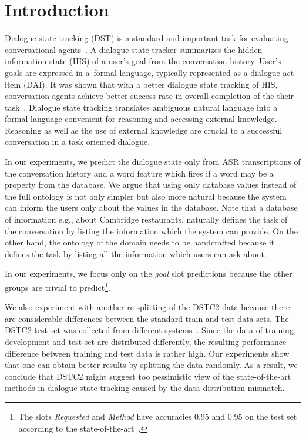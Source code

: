 \documentclass{itatnew}
\def\OD#1{{\color{darkgreen}OD: \it #1}}
\begin{document}
\section{Introduction}
%
Dialogue state tracking (DST) is a standard and important task for evaluating conversational agents~\cite{williams2013dialog, henderson2014second, henderson2014third}.
A dialogue state tracker summarizes the hidden information state (HIS)\cite{young2010hidden} of a user's goal from the conversation history.
User's goals are expressed in a~formal language, typically represented as a dialogue act item (DAI). 
It was shown that with a better dialogue state tracking of HIS, conversation agents achieve better success rate in overall completion of the their task~\cite{jurvcivcek2012reinforcement}.
Dialogue state tracking translates ambiguous natural language into a formal language convenient for reasoning and accessing external knowledge. Reasoning as well as the use of external knowledge are crucial to a successful conversation in a task oriented dialogue.



In our experiments, we predict the dialogue state only from ASR transcriptions of the conversation history and a word feature which fires if a word may be a property from the database.
We argue that using only database values instead of the full ontology is not only simpler but also more natural because the system can inform the users only about the values in the database.
Note that a database of information e.g., about Cambridge restaurants, naturally defines the task of the conversation by listing the information which the system can provide.
On the other hand, the ontology of the domain needs to be handcrafted because it defines the task by listing all the information which users can ask about.

In our experiments, we focus only on the {\it goal} slot predictions because the other groups are trivial to predict\footnote{The slots {\it Requested} and {\it Method} have accuracies 0.95 and 0.95 on the test set according to the state-of-the-art~\cite{williams2014web}.}.

We also experiment with another re-splitting of the DSTC2 data because there are considerable differences between the standard train and test data sets.
The DSTC2 test set was collected from different systems~\cite{henderson2014second}.
Since the data of training, development and test set are distributed differently, the resulting performance difference between training and test data is rather high.
Our experiments show that one can obtain better results by splitting the data randomly.
As a result, we conclude that DSTC2 might suggest too pessimistic view of the state-of-the-art methods in dialogue state tracking caused by the data distribution mismatch.
\end{document}
